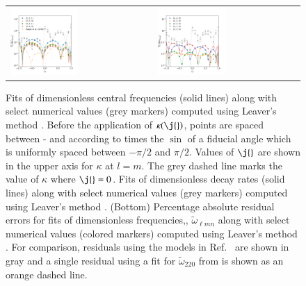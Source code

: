 \documentclass[twocolumn,aps,prd,floatfix,preprintnumbers,a4paper,nofootinbib,
superscriptaddress,10pt]{revtex4-1}
\newcommand{\cw}{\tilde{\omega}}
\def\lmn{_{\ell m n}}
\def\CwFitCalibrationRegion{\red{0.995} }
\begin{document}
\begin{figure}[htb]
\begin{tabular}{ll}
    {\includegraphics[width=0.49\textwidth,trim={0 0.25in 0 0.9in},clip]{res_cw_0.pdf}} & {\includegraphics[width=0.49\textwidth,trim={0 0.25in 0 0.9in},clip]{res_cw_1.pdf}}
  \end{tabular}
	\caption{ Fits of dimensionless \qnm{} central frequencies (solid lines) along with select numerical values (grey markers) computed using Leaver's method \cite{Leaver85}.
  Before the application of $\kappa(\j{})$, points are spaced between -\CwFitCalibrationRegion and \CwFitCalibrationRegion according to \CwFitCalibrationRegion times the $\sin$ of a fiducial angle which is uniformly spaced between $-\pi/2$ and $\pi/2$. Values of $\j{}$ are shown in the upper axis for $\kappa$ at $l=m$.
  The grey dashed line marks the value of $\kappa$ where $\j{}=0$. Fits of dimensionless \qnm{} decay rates (solid lines) along with select numerical values (grey markers) computed using Leaver's method \cite{Leaver85}. (Bottom) Percentage absolute residual errors for fits of dimensionless \qnm{} frequencies,, $\cw\lmn$ along with select numerical values (colored markers) computed using Leaver's method \cite{Leaver85}. For comparison, residuals using the models in Ref.~\cite{Berti:2005ys} are shown in gray and a single residual using a fit for $\cw_{220}$ from \cite{Nagar:2018zoe} is shown as an orange dashed line.}
  \label{fig:qnm}
\end{figure}
\end{document}
